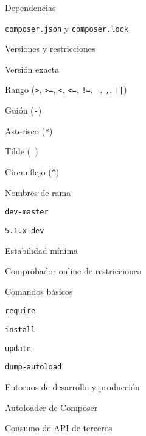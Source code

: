 \begin{longenum}
\begin{longenum}
\begin{longenum}
            \item Dependencias
            \begin{longenum}
                \item \texttt{composer.json} y \texttt{composer.lock}
            \end{longenum}
            \item Versiones y restricciones
            \begin{longenum}
                \item Versión exacta
                \item Rango (\texttt{>}, \texttt{>=}, \texttt{<}, \texttt{<=}, \texttt{!=}, \texttt{ }, \texttt{,}, \texttt{||})
                \item Guión (\texttt{-})
                \item Asterisco (\texttt{*})
                \item Tilde (\texttt{~})
                \item Circunflejo (\texttt{\^})
                \item Nombres de rama
                \begin{longenum}
                    \item \texttt{dev-master}
                    \item \texttt{5.1.x-dev}
                \end{longenum}
                \item Estabilidad mínima
                \item Comprobador online de restricciones
            \end{longenum}
            \item Comandos básicos
            \begin{longenum}
                \item \texttt{require}
                \item \texttt{install}
                \item \texttt{update}
                \item \texttt{dump-autoload}
            \end{longenum}
            \item Entornos de desarrollo y producción
            \item Autoloader de Composer
        \end{longenum}
        \item Consumo de API de terceros
        \begin{longenum}

\end{longenum}
\end{longenum}
\end{longenum}
